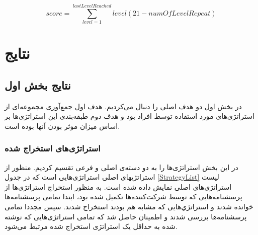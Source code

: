 \documentclass[twoside, a4paper,11pt]{book}
\numberwithin{equation}{chapter}
\numberwithin{table}{chapter}
\numberwithin{figure}{chapter}
\numberwithin{equation}{chapter}
\begin{document}
\begin{equation}
	score = \sum_{level=1}^{lastLevelReached} level(21-numOfLevelRepeat)
\end{equation}


\chapter{نتایج}
\label{chapter:experiments}
\thispagestyle{plain}
\section{نتایج بخش اول}
در بخش اول دو هدف اصلی را دنبال می‌کردیم. هدف اول جمع‌آوری مجموعه‌ای از استراتژی‌های مورد استفاده توسط افراد بود و هدف دوم طبقه‌بندی این استراتژی‌ها بر اساس میزان موثر بودن آنها بوده است.
\subsection{استراتژی‌های استخراج شده}
در این بخش استراتژی‌ها را  به دو دسته‌ی اصلی و فرعی تقسیم  کردیم. منظور از استراتژیهای اصلی استراتژی‌هایی است که  در جدول \ref{StrategyList} لیست استراتژی‌های اصلی نمایش داده شده است. به منظور استخراج استراتژی‌ها از پرسشنامه‌هایی که توسط شرکت‌کننده‌ها تکمیل شده بود، ابتدا تمامی پرسشنامه‌ها خوانده شدند و استراتژي‌هایی که مشابه هم بودند استخراج شدند. سپس مجددا تمامی پرسشنامه‌ها بررسی شدند و اطمینان حاصل شد که تمامی استراتژی‌هایی که نوشته شده به حداقل یک استراتژی استخراج شده مرتبط می‌شود. 
\end{document}
